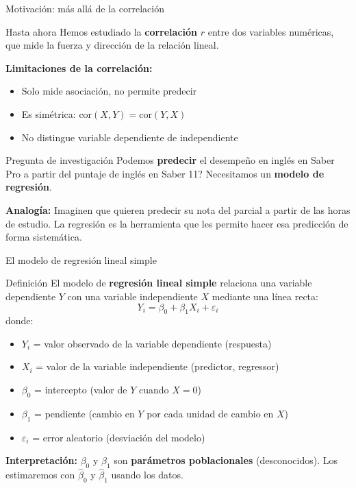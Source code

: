 \documentclass[aspectratio=169, 11pt]{beamer}
\begin{document}
\begin{frame}{Motivación: más allá de la correlación}
\begin{block}{Hasta ahora}
Hemos estudiado la \textbf{correlación} $r$ entre dos variables numéricas, que mide la fuerza y dirección de la relación lineal.
\end{block}

\vspace{0.1cm}
\textbf{Limitaciones de la correlación:}
\begin{itemize}
  \item Solo mide asociación, no permite predecir
  \item Es simétrica: $\text{cor}(X,Y) = \text{cor}(Y,X)$
  \item No distingue variable dependiente de independiente
\end{itemize}

\vspace{0.1cm}
\begin{exampleblock}{Pregunta de investigaci\'on}
\small \textquestiondown Podemos \textbf{predecir} el desempe\~no en ingl\'es en Saber Pro a partir del puntaje de ingl\'es en Saber 11? Necesitamos un \textbf{modelo de regresi\'on}.

\smallskip
\textbf{Analog\'ia:} Imaginen que quieren predecir su nota del parcial a partir de las horas de estudio. La regresi\'on es la herramienta que les permite hacer esa predicci\'on de forma sistem\'atica.
\end{exampleblock}
\end{frame}

\begin{frame}{El modelo de regresión lineal simple}
\begin{block}{Definición}
El modelo de \textbf{regresión lineal simple} relaciona una variable dependiente $Y$ con una variable independiente $X$ mediante una línea recta:
\[
Y_i = \beta_0 + \beta_1 X_i + \varepsilon_i
\]
donde:
\begin{itemize}
  \item $Y_i$ = valor observado de la variable dependiente (respuesta)
  \item $X_i$ = valor de la variable independiente (predictor, regressor)
  \item $\beta_0$ = intercepto (valor de $Y$ cuando $X = 0$)
  \item $\beta_1$ = pendiente (cambio en $Y$ por cada unidad de cambio en $X$)
  \item $\varepsilon_i$ = error aleatorio (desviación del modelo)
\end{itemize}
\end{block}
\vspace{-2pt}
{\small \textbf{Interpretaci\'on:} $\beta_0$ y $\beta_1$ son \textbf{par\'ametros poblacionales} (desconocidos). Los estimaremos con $\hat{\beta}_0$ y $\hat{\beta}_1$ usando los datos.}
\end{frame}
\end{document}
